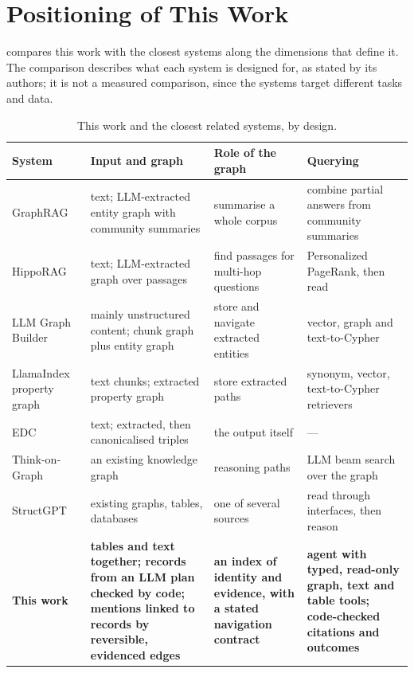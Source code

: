 \section{Positioning of This Work}\label{sec:ch02-positioning-of-this-work}

 compares this work with the closest systems along the dimensions that define it. The
comparison describes what each system is designed for, as stated by its authors; it is not a measured
comparison, since the systems target different tasks and data.

\begin{table}[htbp]
\centering
\caption{This work and the closest related systems, by design.}
\label{tab:positioning}
\scriptsize
\renewcommand{\arraystretch}{1.25}
\begin{tabularx}{\linewidth}{@{}>{\raggedright}p{2.1cm}>{\raggedright}X>{\raggedright}X>{\raggedright\arraybackslash}X@{}}
\toprule
System & Input and graph & Role of the graph & Querying \\
\midrule
GraphRAG~\cite{edge2024local} & text; LLM-extracted entity graph with community summaries & summarise a whole corpus & combine partial answers from community summaries \\
HippoRAG~\cite{gutierrez2024hipporag} & text; LLM-extracted graph over passages & find passages for multi-hop questions & Personalized PageRank, then read \\
LLM Graph Builder~\cite{neo4j2026llmgraphbuilder} & mainly unstructured content; chunk graph plus entity graph & store and navigate extracted entities & vector, graph and text-to-Cypher \\
LlamaIndex property graph~\cite{llamaindex2026propertygraph} & text chunks; extracted property graph & store extracted paths & synonym, vector, text-to-Cypher retrievers \\
EDC~\cite{zhang2024extract} & text; extracted, then canonicalised triples & the output itself & --- \\
Think-on-Graph~\cite{sun2024thinkongraph} & an existing knowledge graph & reasoning paths & LLM beam search over the graph \\
StructGPT~\cite{jiang2023structgpt} & existing graphs, tables, databases & one of several sources & read through interfaces, then reason \\
\midrule
\textbf{This work} & \textbf{tables and text together; records from an LLM plan checked by code; mentions linked to records by reversible, evidenced edges} & \textbf{an index of identity and evidence, with a stated navigation contract} & \textbf{agent with typed, read-only graph, text and table tools; code-checked citations and outcomes} \\
\bottomrule
\end{tabularx}
\end{table}

